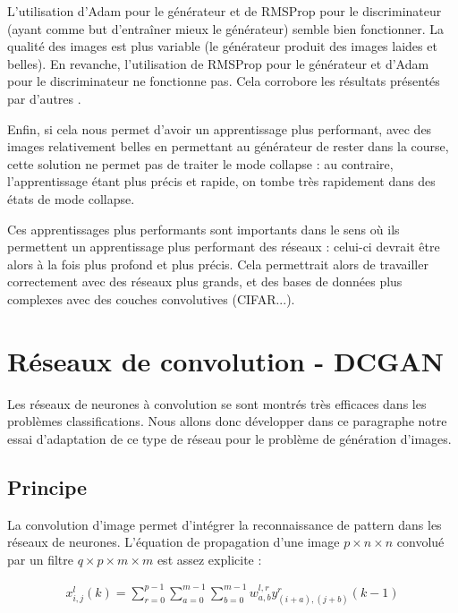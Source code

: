 L’utilisation d’Adam pour le générateur et de RMSProp pour le discriminateur (ayant comme but d'entraîner mieux le générateur) semble bien fonctionner. La qualité des images est plus variable (le générateur produit des images laides et belles).
En revanche, l'utilisation de RMSProp pour le générateur et d'Adam pour le discriminateur ne fonctionne pas. Cela corrobore les résultats présentés par d'autres \cite{ruder_overview_2016}\cite{auriau_apprentissage_2017}.

Enfin, si cela nous permet d'avoir un apprentissage plus performant, avec des images relativement belles en permettant au générateur de rester dans la course, cette solution ne permet pas de traiter le mode collapse : au contraire, l'apprentissage étant plus précis et rapide, on tombe très rapidement dans des états de mode collapse.

Ces apprentissages plus performants sont importants dans le sens où ils permettent un apprentissage plus performant des réseaux : celui-ci devrait être alors à la fois plus profond et plus précis. Cela permettrait alors de travailler correctement avec des réseaux plus grands, et des bases de données plus complexes avec des couches convolutives (CIFAR...).

\section{Réseaux de convolution - DCGAN}
\label{DCGAN}
Les réseaux de neurones à convolution se sont montrés très efficaces dans les problèmes classifications. Nous allons donc développer dans ce paragraphe notre essai d'adaptation de ce type de réseau pour le problème de génération d'images.

\subsection{Principe}
La convolution d'image permet d'intégrer la reconnaissance de pattern dans les réseaux de neurones. L'équation de propagation d'une image $p \times n \times n$ convolué par un filtre $q \times p \times m \times m$ est assez explicite :

\begin{equation} 
\begin{aligned}
x^{l}_{i,j}(k) = \sum^{p-1}_{r=0}{\sum^{m-1}_{a=0}{\sum^{m-1}_{b=0}{w_{a,b}^{l,r}y^{r}_{(i+a),(j+b)}(k-1)}}}
\end{aligned}
\end{equation} 


